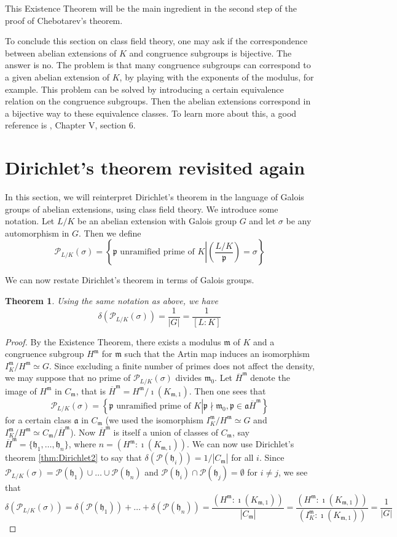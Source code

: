 \documentclass[]{amsart}
\newtheorem{theorem}{Theorem}
\newcommand{\m}{\mathfrak{m}}
\newcommand{\IKm}{I^\mathfrak{m}_K}
\newcommand{\Kmo}{K_{\mathfrak{m},1}}
\renewcommand{\a}{\mathfrak{a}}
\newcommand{\p}{\mathfrak{p}}
\newcommand{\PP}{\mathcal{P}}
\newcommand{\Frob}[2]{\left(\frac{#1}{#2}\right )}
\begin{document}
		This Existence Theorem will be the main ingredient in the second step of the proof of Chebotarev's theorem.
		
		To conclude this section on class field theory, one may ask if the correspondence between abelian extensions of $K$ and congruence subgroups is bijective. The answer is no. The problem is that many congruence subgroups can correspond to a given abelian extension of $K$, by playing with the exponents of the modulus, for example. This problem can be solved by introducing a certain equivalence relation on the congruence subgroups. Then the abelian extensions correspond in a bijective way to these equivalence classes. To learn more about this, a good reference is \cite{Jan}, Chapter V, section 6.
		
		\section{Dirichlet's theorem revisited again}
			In this section, we will reinterpret Dirichlet's theorem in the language of Galois groups of abelian extensions, using class field theory. We introduce some notation. Let $L/K$ be an abelian extension with Galois group $G$ and let $\sigma$ be any automorphism in $G$. Then we define
			\[\PP_{L/K}(\sigma)=\left \{\p\text{ unramified prime of }K\left |\Frob{L/K}{\p}=\sigma\right .\right \}\]
		
		We can now restate Dirichlet's theorem in terms of Galois groups.
		\begin{theorem}
			Using the same notation as above, we have
			\[\delta(\PP_{L/K}(\sigma))=\frac{1}{|G|}=\frac{1}{[L:K]}\]
		\end{theorem}
		\begin{proof}
			By the Existence Theorem, there exists a modulus $\m$ of $K$ and a congruence subgroup $H^\m$ for $\m$ such that the Artin map induces an isomorphism $\IKm/H^\m\simeq G$. Since excluding a finite number of primes does not affect the density, we may suppose that no prime of $\PP_{L/K}(\sigma)$ divides $\m_0$. Let $\overline{H}^\m$ denote the image of $H^\m$ in $C_\m$, that is $\overline{H}^\m=H^\m/\imath(\Kmo)$. Then one sees that 
			\[\PP_{L/K}(\sigma)=\left \{\p\text{ unramified prime of }K\left |\p\nmid\m_0, \p\in \a \overline{H}^\m\right .\right \}\]
		for a certain class $\a$ in $C_\m$ (we used the isomorphism $\IKm/H^\m\simeq G$ and $\IKm/H^\m\simeq C_\m/\overline{H}^\m$). Now $\overline{H}^\m$ is itself a union of classes of $C_\m$, say $\overline{H}^\m=\{\mathfrak{h}_1,\dots,\mathfrak{h}_n\}$, where $n=(H^\m:\imath(\Kmo))$. We can now use Dirichlet's theorem \ref{thm:Dirichlet2} to say that $\delta(\PP(\mathfrak{h}_i))=1/|C_\m|$ for all $i$. Since $\PP_{L/K}(\sigma)=\PP(\mathfrak{h}_1)\cup\dots\cup\PP(\mathfrak{h}_n)$ and $\PP(\mathfrak{h}_i)\cap\PP(\mathfrak{h}_j)=\emptyset$ for $i\neq j$, we see that
			\[\delta(\PP_{L/K}(\sigma))=\delta(\PP(\mathfrak{h}_1))+\dots+\delta(\PP(\mathfrak{h}_n))=\frac{(H^\m:\imath(\Kmo))}{|C_\m|}=\frac{(H^\m:\imath(\Kmo))}{(\IKm:\imath(\Kmo))}=\frac{1}{|G|}\]
		\end{proof}
		
\end{document}
